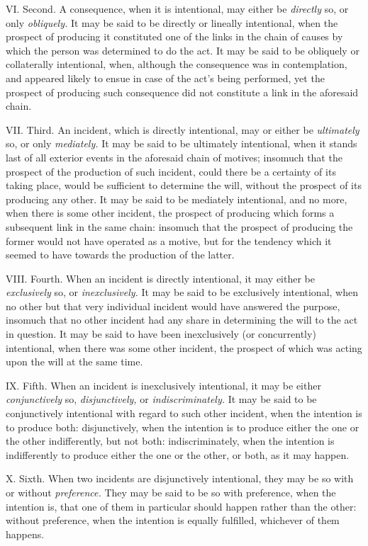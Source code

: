 \documentclass[12pt]{report}
\begin{document}
VI. Second. A consequence, when it is intentional, may either be
\emph{directly} so, or only \emph{obliquely.} It may be said to be
directly or lineally intentional, when the prospect of producing it
constituted one of the links in the chain of causes by which the person
was determined to do the act. It may be said to be obliquely or
collaterally intentional, when, although the consequence was in
contemplation, and appeared likely to ensue in case of the act's being
performed, yet the prospect of producing such consequence did not
constitute a link in the aforesaid chain.

VII. Third. An incident, which is directly intentional, may or either be
\emph{ultimately} so, or only \emph{mediately.} It may be said to be
ultimately intentional, when it stands last of all exterior events in
the aforesaid chain of motives; insomuch that the prospect of the
production of such incident, could there be a certainty of its taking
place, would be sufficient to determine the will, without the prospect
of its producing any other. It may be said to be mediately intentional,
and no more, when there is some other incident, the prospect of
producing which forms a subsequent link in the same chain: insomuch that
the prospect of producing the former would not have operated as a
motive, but for the tendency which it seemed to have towards the
production of the latter.

VIII. Fourth. When an incident is directly intentional, it may either be
\emph{exclusively} so, or \emph{inexclusively.} It may be said to be
exclusively intentional, when no other but that very individual incident
would have answered the purpose, insomuch that no other incident had any
share in determining the will to the act in question. It may be said to
have been inexclusively (or concurrently) intentional, when there was
some other incident, the prospect of which was acting upon the will at
the same time.

IX. Fifth. When an incident is inexclusively intentional, it may be
either \emph{conjunctively} so, \emph{disjunctively,} or
\emph{indiscriminately.} It may be said to be conjunctively intentional
with regard to such other incident, when the intention is to produce
both: disjunctively, when the intention is to produce either the one or
the other indifferently, but not both: indiscriminately, when the
intention is indifferently to produce either the one or the other, or
both, as it may happen.

X. Sixth. When two incidents are disjunctively intentional, they may be
so with or without \emph{preference.} They may be said to be so with
preference, when the intention is, that one of them in particular should
happen rather than the other: without preference, when the intention is
equally fulfilled, whichever of them happens.
\end{document}
